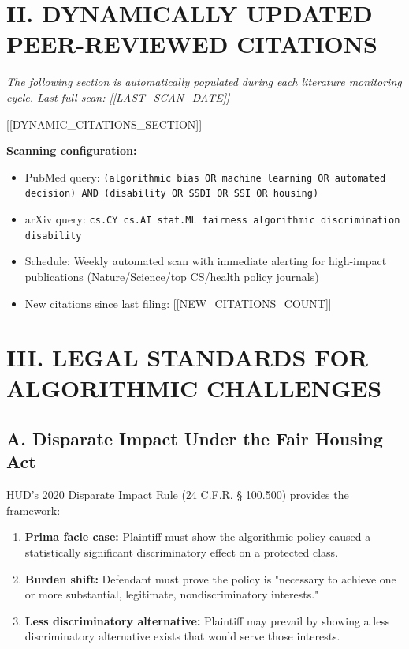 \documentclass[12pt,letterpaper]{article}
\begin{document}
\begin{singlespacing}
\newpage
\section*{II. DYNAMICALLY UPDATED PEER-REVIEWED CITATIONS}

\noindent\textit{The following section is automatically populated during each literature monitoring cycle. Last full scan: [[LAST_SCAN_DATE]]}

[[DYNAMIC_CITATIONS_SECTION]]

\vspace{12pt}
\noindent\textbf{Scanning configuration:}
\begin{itemize}
    \item PubMed query: \texttt{(algorithmic bias OR machine learning OR automated decision) AND (disability OR SSDI OR SSI OR housing)}
    \item arXiv query: \texttt{cs.CY cs.AI stat.ML fairness algorithmic discrimination disability}
    \item Schedule: Weekly automated scan with immediate alerting for high-impact publications (Nature/Science/top CS/health policy journals)
    \item New citations since last filing: [[NEW_CITATIONS_COUNT]]
\end{itemize}

\section*{III. LEGAL STANDARDS FOR ALGORITHMIC CHALLENGES}

\subsection*{A. Disparate Impact Under the Fair Housing Act}

HUD's 2020 Disparate Impact Rule (24 C.F.R. § 100.500) provides the framework:
\begin{enumerate}
    \item \textbf{Prima facie case:} Plaintiff must show the algorithmic policy caused a statistically significant discriminatory effect on a protected class.
    \item \textbf{Burden shift:} Defendant must prove the policy is "necessary to achieve one or more substantial, legitimate, nondiscriminatory interests."
    \item \textbf{Less discriminatory alternative:} Plaintiff may prevail by showing a less discriminatory alternative exists that would serve those interests.
\end{enumerate}


\end{singlespacing}
\end{document}
